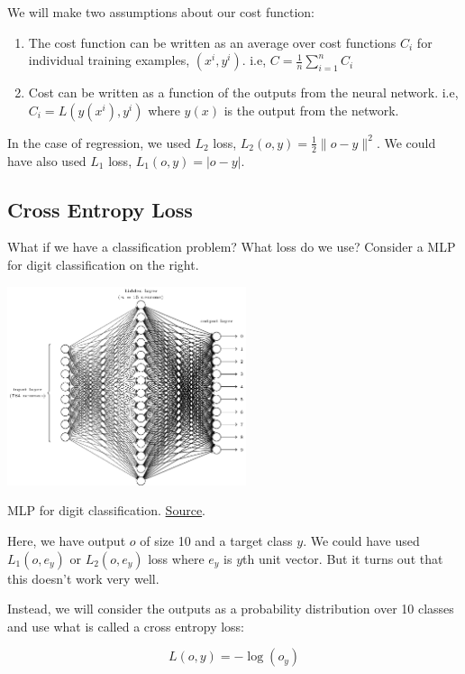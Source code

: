 \documentclass[a4paper]{tufte-handout}
\begin{document}
We will make two assumptions about our cost function:

\begin{enumerate}
\item
  The cost function can be written as an average over cost functions
  \(C_i\) for individual training examples, \((x^i, y^i)\). i.e,
  \(C = \frac{1}{n} \sum_{i = 1}^{n} C_i\)
\item
  Cost can be written as a function of the outputs from the neural
  network. i.e, \(C_i = L(y(x^i), y^i)\) where \(y(x)\) is the output
  from the network.
\end{enumerate}

In the case of regression, we used \(L_2\) loss,
\(L_2(o, y) = \frac{1}{2} \| o - y\|^2\). We could have also used \(L_1\)
loss, \(L_1(o, y) = | o - y |\).

\subsection{Cross Entropy Loss}

What if we have a classification problem? What loss do we use? Consider
a MLP for digit classification on the right.

\begin{marginfigure}
  \includegraphics[width=70mm]{tikz12}
  \caption{ MLP for digit classification.
  \href{http://neuralnetworksanddeeplearning.com/chap1.html\%22}{Source}.
  }
\end{marginfigure}

Here, we have output \(o\) of size 10 and a target class \(y\). We could
have used \(L_1(o, e_y)\) or \(L_2(o, e_y)\) loss where \(e_y\) is
\(y\)th unit vector. But it turns out that this doesn't work very well.

Instead, we will consider the outputs as a probability distribution over
10 classes and use what is called a cross entropy loss:

\[ L(o, y) = - \log(o_y) \]
\end{document}
